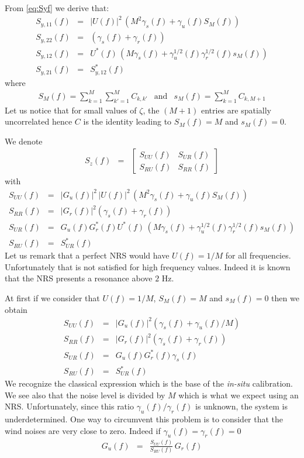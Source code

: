From \eqref{eq:Syf} we derive that:
\begin{eqnarray*}
\label{eq:Syentries}
S_{y,11}(f)&=&
|U(f)|^2 \, (M^2\gamma_{s}(f) + \gamma_{u}(f) S_M(f))
\\
S_{y,22}(f)&=&(\gamma_{s}(f) +\gamma_{r}(f))
\\
S_{y,12}(f)&=&
U^{*}(f)\, (M\gamma_{s}(f)+\gamma_{u}^{1/2}(f)\gamma_{r}^{1/2}(f)s_M(f))
\\
S_{y,21}(f)&=&S_{y,12}^{*}(f)
\end{eqnarray*}
where
\begin{eqnarray*}
 S_M(f) =\sum_{k=1}^{M}\sum_{k'=1}^{M}C_{k,k'}
&\mathrm{and}&
 s_M(f) =\sum_{k=1}^{M}C_{k,M+1}
\end{eqnarray*}
Let us notice that for small values of $\zeta$, the $(M+1)$ entries are spatially uncorrelated hence $C$ is the identity leading to
$S_M(f)=M$ and $s_M(f) =0$.

We denote 
\begin{eqnarray*}
S_{z}(f)&=&
\begin{bmatrix}
S_{UU}(f)&S_{UR}(f)
\\
S_{RU}(f)&S_{RR}(f)
\end{bmatrix}
\end{eqnarray*}
with
\begin{eqnarray}
\label{eq:Syentries}
S_{UU}(f)&=& |G_{u}(f)|^2 \,|U(f)|^2 \, (M^2 \gamma_{s}(f)+ \gamma_{u}(f) S_M(f))
\\
S_{RR}(f)&=&|G_{r}(f)|^2 (\gamma_{s}(f)+\gamma_{r}(f))
\\
S_{UR}(f)&=& G_{u}(f)G_{r}^{*}(f)U^{*}(f)\, 
   (M\gamma_{s}(f)+\gamma_{u}^{1/2}(f)\gamma_{r}^{1/2}(f)s_M(f))
\\
S_{RU}(f)&=&S_{UR}^{*}(f)
\end{eqnarray}
Let us remark that a perfect NRS would have $U(f)=1/M$ for all frequencies. Unfortunately that is not satisfied for high frequency values. Indeed it is known that the NRS presents a resonance above $2$ Hz.

At first  if we consider that $U(f)=1/M$, $S_M(f)=M$ and $s_{M}(f)=0$ then we obtain
\begin{eqnarray}
\label{eq:Syentries-idealcase}
S_{UU}(f)&=& |G_{u}(f)|^2  (\gamma_{s}(f)+ \gamma_{u}(f) /M)
\\
S_{RR}(f)&=&|G_{r}(f)|^2 (\gamma_{s}(f)+\gamma_{r}(f))
\\
S_{UR}(f)&=& G_{u}(f)G_{r}^{*}(f) \gamma_{s}(f)
\\
S_{RU}(f)&=&S_{UR}^{*}(f)
\end{eqnarray}
We recognize the classical expression which is the base of the {\it in-situ} calibration. We see also that the noise level is divided by $M$ which is what we expect using an NRS. Unfortunately, since  this ratio $\gamma_{u}(f)/\gamma_{r}(f)$ is unknown, the system is underdetermined. One way to circumvent  this problem is to consider that the wind noises are very close to zero. Indeed if $\gamma_{u}(f)=\gamma_{r}(f)=0$
\begin{eqnarray*}
 G_{u}(f) &=& \frac{S_{UU}(f)}{S_{RU}(f)}\, G_{r}(f)
\end{eqnarray*}


